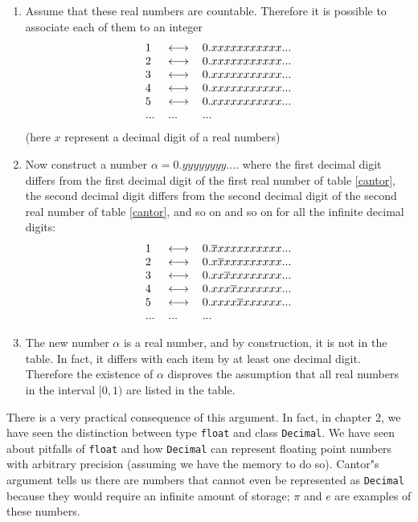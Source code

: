 \documentclass[justified, sixbynine]{tufte-book}
\def\ft{\small\tt}
\theoremstyle{plain}%
\newtheorem * {corollary}{Corollary}
\theoremstyle{definition}
\theoremstyle{remark}
\newtheorem * {remark}{Remark}
\newtheorem * {note}{Note}
\begin{document}
\begin{fullwidth}
\begin{enumerate}
\item  Assume that these real numbers are countable. Therefore it is
possible to associate each of them to an integer
\begin{equation}
\begin{tabular}{lll}
1 & $\longleftrightarrow $ & $0.xxxxxxxxxxx...$ \\
2 & $\longleftrightarrow $ & $0.xxxxxxxxxxx...$ \\
3 & $\longleftrightarrow $ & $0.xxxxxxxxxxx...$ \\
4 & $\longleftrightarrow $ & $0.xxxxxxxxxxx...$ \\
5 & $\longleftrightarrow $ & $0.xxxxxxxxxxx...$ \\
... & ... & ...
\end{tabular}
\label{cantor}
\end{equation}
(here $x$ represent a decimal digit of a real numbers)

\item  Now construct a number $\alpha =0.yyyyyyyy....$ where the first
decimal digit differs from the first decimal digit of the first real number
of table \ref{cantor}, the second decimal digit differs from the second
decimal digit of the second real number of table \ref{cantor}, and so on and
so on for all the infinite decimal digits:
\begin{equation}
\begin{tabular}{lll}
1 & $\longleftrightarrow $ & $0.\overline{x}xxxxxxxxxx...$ \\
2 & $\longleftrightarrow $ & $0.x\overline{x}xxxxxxxxx...$ \\
3 & $\longleftrightarrow $ & $0.xx\overline{x}xxxxxxxx...$ \\
4 & $\longleftrightarrow $ & $0.xxx\overline{x}xxxxxxx...$ \\
5 & $\longleftrightarrow $ & $0.xxxx\overline{x}xxxxxx...$ \\
... & ... & ...
\end{tabular}
\label{cantor2}
\end{equation}

\item  The new number $\alpha $ is a real number, and by construction, it is
not in the table. In fact, it differs with each item by at least one decimal
digit. Therefore the existence of $\alpha $ disproves the assumption that
all real numbers in the interval $[0, 1)$ are listed in the table.
\end{enumerate}

There is a very practical consequence of this argument. In fact, in chapter 2, we have seen the distinction between type {\ft float} and class {\ft Decimal}. We have seen about pitfalls of {\ft float} and how {\ft Decimal} can represent floating point numbers with arbitrary precision (assuming we have the memory to do so). Cantor"s argument tells us there are numbers that cannot even be represented as {\ft Decimal} because they would require an infinite amount of storage; $\pi$ and $e$ are examples of these numbers.


\end{fullwidth}
\end{document}
